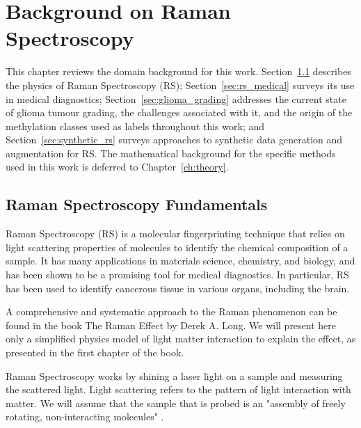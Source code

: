 \chapter{Background on Raman Spectroscopy}
\label{ch:background}

This chapter reviews the domain background for this work. Section~\ref{sec:rs_fundamentals} describes the physics of Raman Spectroscopy (RS); Section~\ref{sec:rs_medical} surveys its use in medical diagnostics; Section~\ref{sec:glioma_grading} addresses the current state of glioma tumour grading, the challenges associated with it, and the origin of the methylation classes used as labels throughout this work; and Section~\ref{sec:synthetic_rs} surveys approaches to synthetic data generation and augmentation for RS. The mathematical background for the specific methods used in this work is deferred to Chapter~\ref{ch:theory}.

\section{Raman Spectroscopy Fundamentals}
\label{sec:rs_fundamentals}
Raman Spectroscopy (RS) is a molecular fingerprinting technique that relies on light scattering properties of molecules to identify the chemical composition of a sample. \cite{Jones2019} It has many applications in materials science, chemistry, and biology, and has been shown to be a promising tool for medical diagnostics. \cite{shen2026advances,stupak2025raman} In particular, RS has been used to identify cancerous tissue in various organs, including the brain. \cite{Auner2018}

A comprehensive and systematic approach to the Raman phenomenon can be found in the book The Raman Effect by Derek A. Long. \cite{Long2002} We will present here only a simplified physics model of light matter interaction to explain the effect, as presented in the first chapter of the book. 

Raman Spectroscopy works by shining a laser light on a sample and measuring the scattered light. Light scattering refers to the pattern of light interaction with matter. We will assume that the sample that is probed is an "assembly of freely rotating, non-interacting molecules" \cite{Long2002}.

